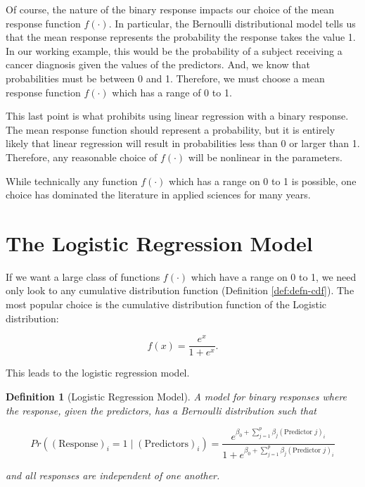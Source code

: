\documentclass[
]{book}
\theoremstyle{plain}
\theoremstyle{mydefn}
\newtheorem{definition}{Definition}[chapter]
\theoremstyle{myexmpl}
\theoremstyle{remark}
\begin{document}
Of course, the nature of the binary response impacts our choice of the mean response function \(f(\cdot)\). In particular, the Bernoulli distributional model tells us that the mean response represents the probability the response takes the value 1. In our working example, this would be the probability of a subject receiving a cancer diagnosis given the values of the predictors. And, we know that probabilities must be between 0 and 1. Therefore, we must choose a mean response function \(f(\cdot)\) which has a range of 0 to 1.

This last point is what prohibits using linear regression with a binary response. The mean response function should represent a probability, but it is entirely likely that linear regression will result in probabilities less than 0 or larger than 1. Therefore, any reasonable choice of \(f(\cdot)\) will be nonlinear in the parameters.

While technically any function \(f(\cdot)\) which has a range on 0 to 1 is possible, one choice has dominated the literature in applied sciences for many years.

\hypertarget{the-logistic-regression-model}{%
\section{The Logistic Regression Model}\label{the-logistic-regression-model}}

If we want a large class of functions \(f(\cdot)\) which have a range on 0 to 1, we need only look to any cumulative distribution function (Definition \ref{def:defn-cdf}). The most popular choice is the cumulative distribution function of the Logistic distribution:

\[f(x) = \frac{e^x}{1 + e^x}.\]

This leads to the logistic regression model.

\begin{definition}[Logistic Regression Model]
\protect\hypertarget{def:defn-logistic-regression}{}{\label{def:defn-logistic-regression} {} }A model for binary responses where the response, given the predictors, has a Bernoulli distribution such that

\[Pr\left((\text{Response})_i = 1 \mid (\text{Predictors})_i\right) = 
    \frac{e^{\beta_0 + \sum_{j=1}^{p} \beta_j (\text{Predictor } j)_i}}{1 + e^{\beta_0 + \sum_{j=1}^{p} \beta_j (\text{Predictor } j)_i}}\]

and all responses are independent of one another.
\end{definition}
\end{document}
